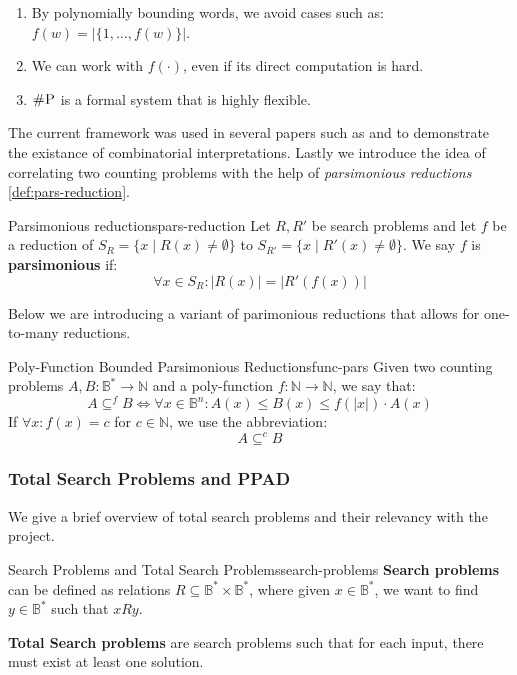 \begin{enumerate}
    \item By polynomially bounding words, we avoid cases such as: $f(w) = |\{1, \hdots, f(w)\}|$.
    \item We can work with $f(\cdot)$, even if its direct computation is hard.
    \item $\textsc{\#P}$ is a formal system that is highly flexible.
\end{enumerate}

The current framework was used in several papers such as
\cite{ikenmeyer_WhatWhatNot_2022} and \cite{ikenmeyer_PositivitySymmetricGroup_2024}
to demonstrate the existance of combinatorial interpretations.
Lastly we introduce the idea of correlating two counting problems with the help of
\textit{parsimonious reductions} \ref{def:pars-reduction}.


\begin{definitionbox}{Parsimonious reductions}{pars-reduction}
    Let $R, R'$ be search problems and let $f$ be a reduction of
    $S_R = \{x \mid R(x) \neq \emptyset \}$ to $S_{R'} = \{x \mid R'(x) \neq \emptyset \}$.
    We say $f$ is \textbf{parsimonious} if:
    $$
    \forall x \in S_R : |R(x)| = |R'(f(x))|
    $$ 
\end{definitionbox}

Below we are introducing a variant of parimonious reductions that allows
for one-to-many reductions. 
\begin{definitionbox}{Poly-Function Bounded Parsimonious Reductions}{func-pars}
    Given two counting problems $A, B : \mathbb{B}^* \to \mathbb{N}$
    and a poly-function $f : \mathbb{N} \to \mathbb{N}$, we
    say that:
    $$
    A \subseteq^f B \iff \forall x \in \mathbb{B}^n:  A(x) \leq B(x) \leq f(|x|) \cdot A(x)
    $$
    If $\forall x : f(x) = c$ for $c \in \mathbb{N}$, we use the abbreviation:
    $$
    A \subseteq^c B
    $$
\end{definitionbox}

\subsubsection{Total Search Problems and PPAD}
We give a brief overview of total search problems and their relevancy with the project.

\begin{definitionbox}{Search Problems and Total Search Problems}{search-problems}
    \textbf{Search problems} can be defined as relations $R \subseteq \mathbb{B}^* \times \mathbb{B}^*$,
    where given $x \in \mathbb{B}^*$, we want to find $y \in \mathbb{B}^*$  such that $xRy$.

    \textbf{Total Search problems} are search problems such that for each input, there must exist at least one solution.
\end{definitionbox}


